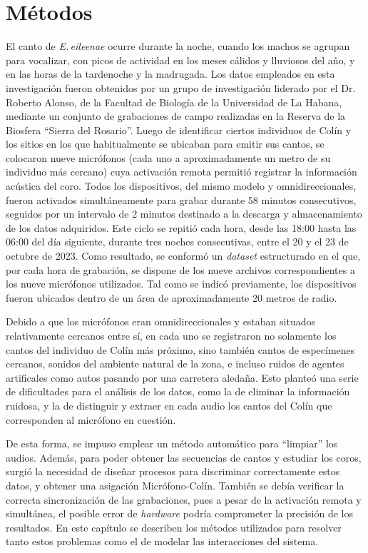 \chapter{Métodos}\label{chapter:Methods}


El canto de \emph{E.\,eileenae} ocurre durante la noche, 
cuando los machos se agrupan para vocalizar, con picos de 
actividad en los meses cálidos y lluviosos del año, y en las
horas de la tardenoche y la madrugada. Los datos empleados en 
esta investigación fueron obtenidos por un grupo de 
investigación liderado por el Dr. Roberto Alonso, de la 
Facultad de Biología de la Universidad de La Habana, mediante 
un conjunto de grabaciones de campo realizadas en la Reserva 
de la Biosfera “Sierra del Rosario”. Luego de identificar 
ciertos individuos de Colín y los sitios en los que 
habitualmente se ubicaban para emitir sus cantos, se 
colocaron nueve micrófonos (cada uno a aproximadamente un 
metro de su individuo más cercano) cuya activación remota 
permitió registrar la información acústica del coro. Todos los 
dispositivos, del mismo modelo y omnidireccionales, 
fueron activados simultáneamente para grabar durante 58 minutos 
consecutivos, seguidos por un intervalo de 2 minutos destinado a 
la descarga y almacenamiento de los datos adquiridos. Este 
ciclo se repitió cada hora, desde las 18:00 hasta las 06:00 
del día siguiente, durante tres noches consecutivas, entre el 
20 y el 23 de octubre de 2023. Como resultado, se conformó un 
\textit{dataset} estructurado en el que, por cada hora de 
grabación, se dispone de los nueve archivos correspondientes a 
los nueve micrófonos utilizados. Tal como se indicó 
previamente, los dispositivos fueron ubicados dentro de un 
área de aproximadamente 20 metros de radio.



Debido a que los micrófonos eran omnidireccionales y estaban situados 
relativamente cercanos entre sí, en cada uno se registraron no solamente
los cantos del individuo de Colín más próximo, sino también cantos de especímenes
cercanos, sonidos del ambiente natural de la zona, e incluso ruidos de 
agentes artificales como autos pasando por una carretera aledaña.
Esto planteó una serie de dificultades para el análisis de los datos,
como la de eliminar la información ruidosa, y la de distinguir y extraer
en cada audio los cantos del Colín que corresponden al micrófono en cuestión. 

De esta forma, se impuso emplear un método automático para “limpiar” los audios.
Además, para poder obtener las secuencias de cantos y estudiar los coros,
surgió la necesidad de diseñar procesos para discriminar correctamente
estos datos, y obtener una asigación Micrófono-Colín.   
También se debía verificar la correcta sincronización de las grabaciones,
pues a pesar de la activación remota y simultánea, el posible error de \emph{hardware}
podría comprometer la precisión de los resultados. En este capítulo
se describen los métodos utilizados para resolver tanto estos problemas
como el de modelar las interacciones del sistema. 

